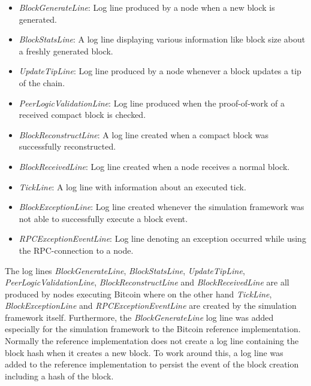 \begin{itemize}
   \item \textit{BlockGenerateLine}: Log line produced by a node when a new block is generated.
   \item \textit{BlockStatsLine}: A log line displaying various information like block size about a freshly generated block.
   \item \textit{UpdateTipLine}: Log line produced by a node whenever a block updates a tip of the chain.
   \item \textit{PeerLogicValidationLine}: Log line produced when the proof-of-work of a received compact block is checked.  
   \item \textit{BlockReconstructLine}: A log line created when a compact block was successfully reconstructed.
   \item \textit{BlockReceivedLine}: Log line created when a node receives a normal block.
   \item \textit{TickLine}: A log line with information about an executed tick.
   \item \textit{BlockExceptionLine}: Log line created whenever the simulation framework was not able to successfully execute a block event.
   \item \textit{RPCExceptionEventLine}: Log line denoting an exception occurred while using the RPC-connection to a node.
\end{itemize}

The log lines \textit{BlockGenerateLine}, \textit{BlockStatsLine}, \textit{UpdateTipLine}, \textit{PeerLogicValidationLine}, \textit{BlockReconstructLine} and \textit{BlockReceivedLine} are all produced by nodes executing Bitcoin where on the other hand \textit{TickLine}, \textit{BlockExceptionLine} and \textit{RPCExceptionEventLine} are created by the simulation framework itself.
Furthermore, the \textit{BlockGenerateLine} log line was added especially for the simulation framework to the Bitcoin reference implementation.
Normally the reference implementation does not create a log line containing the block hash when it creates a new block.
To work around this, a log line was added to the reference implementation to persist the event of the block creation including a hash of the block.

